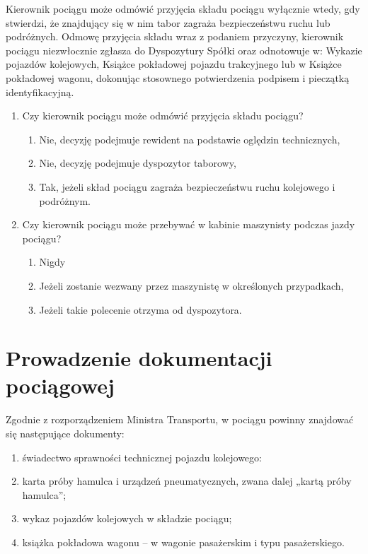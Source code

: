 Kierownik pociągu może odmówić przyjęcia składu pociągu wyłącznie wtedy, gdy stwierdzi, że znajdujący się w nim tabor zagraża bezpieczeństwu ruchu lub podróżnych. Odmowę przyjęcia składu wraz z podaniem przyczyny, kierownik pociągu niezwłocznie zgłasza do Dyspozytury Spółki oraz odnotowuje w:
Wykazie pojazdów kolejowych, Książce pokładowej pojazdu trakcyjnego lub w Książce pokładowej wagonu, dokonując stosownego potwierdzenia podpisem
i pieczątką identyfikacyjną.

\begin{tcolorbox}
	\begin{enumerate}
		\item Czy kierownik pociągu może odmówić przyjęcia składu pociągu?
		\begin{enumerate}
			\item Nie, decyzję podejmuje rewident na podstawie oględzin technicznych,
			\item Nie, decyzję podejmuje dyspozytor taborowy,
			\item Tak, jeżeli skład pociągu zagraża bezpieczeństwu ruchu kolejowego i podróżnym.
		\end{enumerate}
		\item Czy kierownik pociągu może przebywać w kabinie maszynisty podczas jazdy pociągu?
		\begin{enumerate}
			\item Nigdy
			\item Jeżeli zostanie wezwany przez maszynistę w określonych przypadkach,
			\item Jeżeli takie polecenie otrzyma od dyspozytora.
		\end{enumerate}
	\end{enumerate}
\end{tcolorbox}

\chapter{Prowadzenie dokumentacji pociągowej}

Zgodnie z rozporządzeniem Ministra Transportu, w pociągu powinny znajdować się następujące dokumenty:
\begin{enumerate}
	\item świadectwo sprawności technicznej pojazdu kolejowego:
	\item karta próby hamulca i urządzeń pneumatycznych, zwana dalej „kartą próby hamulca”;
	\item wykaz pojazdów kolejowych w składzie pociągu;
	\item książka pokładowa wagonu – w wagonie pasażerskim i typu pasażerskiego.
\end{enumerate}

